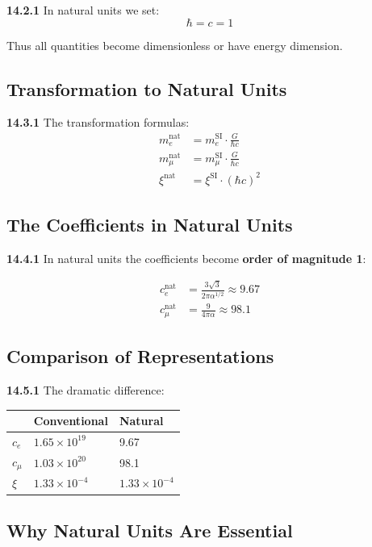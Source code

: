 \noindent \textbf{14.2.1} In natural units we set:
\[
\hbar = c = 1
\]

Thus all quantities become dimensionless or have energy dimension.

\subsection{Transformation to Natural Units}

\noindent \textbf{14.3.1} The transformation formulas:
\begin{align*}
	m_e^{\text{nat}} &= m_e^{\text{SI}} \cdot \frac{G}{\hbar c} \\
	m_\mu^{\text{nat}} &= m_\mu^{\text{SI}} \cdot \frac{G}{\hbar c} \\
	\xi^{\text{nat}} &= \xi^{\text{SI}} \cdot (\hbar c)^2
\end{align*}

\subsection{The Coefficients in Natural Units}

\noindent \textbf{14.4.1} In natural units the coefficients become \textbf{order of magnitude 1}:

\begin{align*}
	c_e^{\text{nat}} &= \frac{3\sqrt{3}}{2\pi\alpha^{1/2}} \approx 9.67 \\
	c_\mu^{\text{nat}} &= \frac{9}{4\pi\alpha} \approx 98.1
\end{align*}

\subsection{Comparison of Representations}

\noindent \textbf{14.5.1} The dramatic difference:

\begin{tabular}{lll}
	& Conventional & Natural \\
	\midrule
	$c_e$ & $1.65 \times 10^{19}$ & 9.67 \\
	$c_\mu$ & $1.03 \times 10^{20}$ & 98.1 \\
	$\xi$ & $1.33 \times 10^{-4}$ & $1.33 \times 10^{-4}$ \\
\end{tabular}

\subsection{Why Natural Units Are Essential}

